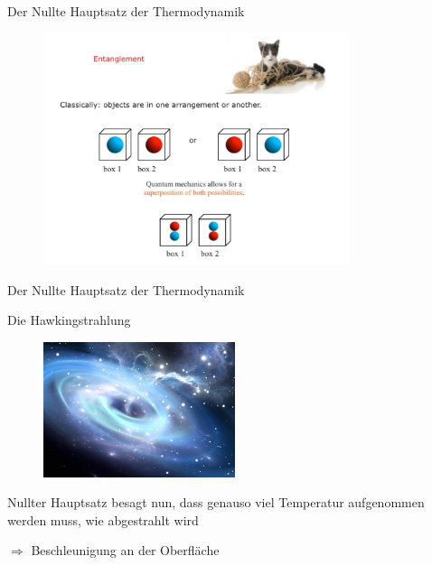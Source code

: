 \documentclass[ngerman,ph]{URbeamer}
\begin{document}
	\begin{frame}{Der Nullte Hauptsatz der Thermodynamik}	
		\begin{figure} [h] 
			\begin{center}
				\includegraphics[width=0.8\textwidth]{entanglement}
			\end{center}
		\end{figure} 	%
	\end{frame}
	\begin{frame}{Der Nullte Hauptsatz der Thermodynamik}
		\begin{center}
			\Large{Die Hawkingstrahlung} 
		\end{center}
		\begin{figure} [h] 
			\begin{center}
				\includegraphics[width=0.5\textwidth]{Hawkingstrahlung}
			\end{center}
		\end{figure} %
		\begin{block}{}
			Nullter Hauptsatz besagt nun, dass genauso viel Temperatur aufgenommen werden muss, wie abgestrahlt wird 
		
			$\Rightarrow$ Beschleunigung an der Oberfläche	
		\end{block}
	\end{frame}
	
\end{document}
